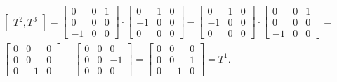 \begin{gather*}
\begin{bmatrix}
T^2 , T^3
\end{bmatrix} =
\begin{bmatrix} 0 & 0 & 1 \\
 0 & 0 & 0 \\
  -1 & 0 & 0 
  \end{bmatrix}
  \cdot
  \begin{bmatrix} 0 & 1 & 0 \\
 -1 & 0 & 0 \\
  0 & 0 & 0 
  \end{bmatrix}
  -
  \begin{bmatrix} 0 & 1 & 0 \\
 -1 & 0 & 0 \\
  0 & 0 & 0 
  \end{bmatrix}
  \cdot
  \begin{bmatrix} 0 & 0 & 1 \\
 0 & 0 & 0 \\
  -1 & 0 & 0 
  \end{bmatrix} =\\
  \begin{bmatrix} 0 & 0 & 0 \\
 0 & 0 & 0 \\
  0 & -1 & 0 
  \end{bmatrix} -
  \begin{bmatrix} 0 & 0 & 0 \\
 0 & 0 & -1 \\
  0 & 0 & 0 
  \end{bmatrix} = 
  \begin{bmatrix} 0 & 0 & 0 \\
 0 & 0 & 1 \\
  0 & -1 & 0 
  \end{bmatrix} =T^1.
\end{gather*}

